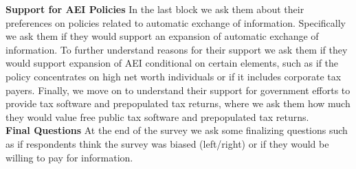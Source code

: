 \documentclass[11pt]{article}
\begin{document}
\textbf{Support for AEI Policies}
In the last block we ask them about their preferences on policies related to automatic exchange of information. Specifically we ask them if they would support an expansion of automatic exchange of information. To further understand reasons for their support we ask them if they would support expansion of AEI conditional on certain elements, such as if the policy concentrates on high net worth individuals or if it includes corporate tax payers. Finally, we move on to understand their support for government efforts to provide tax software and prepopulated tax returns, where we ask them how much they would value free public tax software and prepopulated tax returns. \\[0.5em]
\textbf{Final Questions}
At the end of the survey we ask some finalizing questions such as if respondents think the survey was biased (left/right) or if they would be willing to pay for information. 
\end{document}
